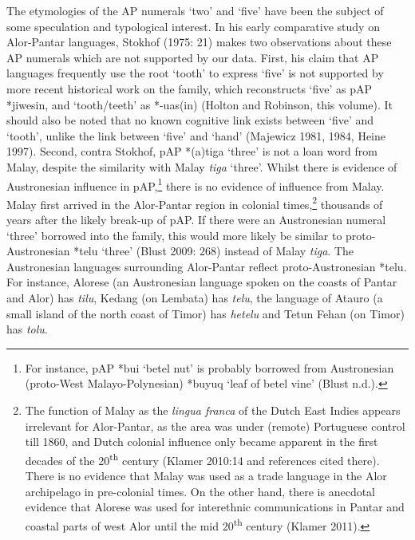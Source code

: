 The etymologies of the AP numerals {\textquoteleft}two{\textquoteright} and {\textquoteleft}five{\textquoteright} have been the subject of some speculation and typological interest. In his early comparative study on Alor-Pantar languages, Stokhof (1975: 21) makes two observations about these AP numerals which are not supported by our data. First, his claim that AP languages frequently use the root {\textquoteleft}tooth{\textquoteright} to express {\textquoteleft}five{\textquoteright} is not supported by more recent historical work on the family, which reconstructs {\textquoteleft}five{\textquoteright} as pAP *jiwesin, and {\textquoteleft}tooth/teeth{\textquoteright} as *-uas(in) (Holton and Robinson, this volume). It should also be noted that no known cognitive link exists between {\textquoteleft}five{\textquoteright} and {\textquoteleft}tooth{\textquoteright}, unlike the link between {\textquoteleft}five{\textquoteright} and {\textquoteleft}hand{\textquoteright} (Majewicz 1981, 1984, Heine 1997). Second, 
contra Stokhof, pAP *(a)tiga\textit{ }{\textquoteleft}three{\textquoteright} is not a loan word from Malay, despite the similarity with Malay \textit{tiga }{\textquoteleft}three{\textquoteright}. Whilst there is evidence of Austronesian influence in pAP,\footnote{For instance, pAP *bui {\textquoteleft}betel nut{\textquoteright} is probably borrowed from Austronesian (proto-West Malayo-Polynesian) *buyuq {\textquoteleft}leaf of betel vine{\textquoteright} (Blust n.d.). }  there is no evidence of influence from Malay. Malay first arrived in the Alor-Pantar region in colonial times,\textstylefootnotereference{ }\footnote{The function of Malay as the \textit{lingua franca} of the Dutch East Indies appears irrelevant for Alor-Pantar, as the area was under (remote) Portuguese control till 1860, and Dutch colonial influence only became apparent in the first decades of the 20\textsuperscript{th }century (Klamer 2010:14 and references cited there). There is no evidence that Malay was used as a trade language in the 
Alor archipelago in pre-colonial times. On the other hand, there is anecdotal evidence that Alorese was used for interethnic communications in Pantar and coastal parts of west Alor until the mid 20\textsuperscript{th} century (Klamer 2011).}  thousands of years after the likely break-up of pAP. If there were an Austronesian numeral {\textquoteleft}three{\textquoteright} borrowed into the family, this would more likely be similar to proto-Austronesian  *telu {\textquoteleft}three{\textquoteright} (Blust 2009: 268) instead of Malay \textit{tiga}. The Austronesian languages surrounding Alor-Pantar reflect proto-Austronesian *telu. For instance, Alorese (an Austronesian language spoken on the coasts of Pantar and Alor) has \textit{tilu}, Kedang (on Lembata) has \textit{telu}, the language of Atauro (a small island of the north coast of Timor) has \textit{hetelu} and Tetun Fehan (on Timor) has \textit{tolu}.

